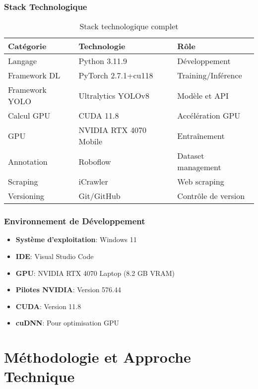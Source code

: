 \documentclass[a4paper,12pt]{report}
\begin{document}
\subsection{Stack Technologique}

\begin{table}[H]
    \centering
    \begin{tabular}{|l|l|l|}
    \hline
    \textbf{Catégorie} & \textbf{Technologie} & \textbf{Rôle} \\
    \hline
    Langage & Python 3.11.9 & Développement \\
    \hline
    Framework DL & PyTorch 2.7.1+cu118 & Training/Inférence \\
    \hline
    Framework YOLO & Ultralytics YOLOv8 & Modèle et API \\
    \hline
    Calcul GPU & CUDA 11.8 & Accélération GPU \\
    \hline
    GPU & NVIDIA RTX 4070 Mobile & Entraînement \\
    \hline
    Annotation & Roboflow & Dataset management \\
    \hline
    Scraping & iCrawler & Web scraping \\
    \hline
    Versioning & Git/GitHub & Contrôle de version \\
    \hline
    \end{tabular}
    \caption{Stack technologique complet}
\end{table}

\subsection{Environnement de Développement}

\begin{itemize}
    \item \textbf{Système d'exploitation}: Windows 11
    \item \textbf{IDE}: Visual Studio Code
    \item \textbf{GPU}: NVIDIA RTX 4070 Laptop (8.2 GB VRAM)
    \item \textbf{Pilotes NVIDIA}: Version 576.44
    \item \textbf{CUDA}: Version 11.8
    \item \textbf{cuDNN}: Pour optimisation GPU
\end{itemize}

\chapter{Méthodologie et Approche Technique}
\end{document}
